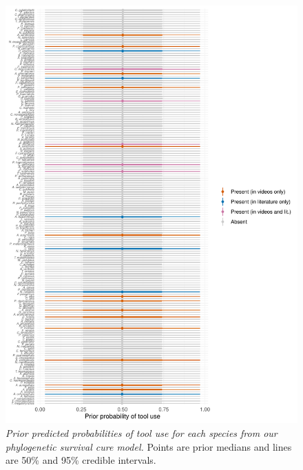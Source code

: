 \documentclass[
  man, donotrepeattitle,floatsintext]{apa6}
\begin{document}
\begin{figure}
\centering
\includegraphics{manuscript_files/figure-latex/plotSurvCure7-1.pdf}
\caption{\label{fig:plotSurvCure7}\emph{Prior predicted probabilities of tool use for each species from our phylogenetic survival cure model.} Points are prior medians and lines are 50\% and 95\% credible intervals.}
\end{figure}

\newpage
\end{document}
